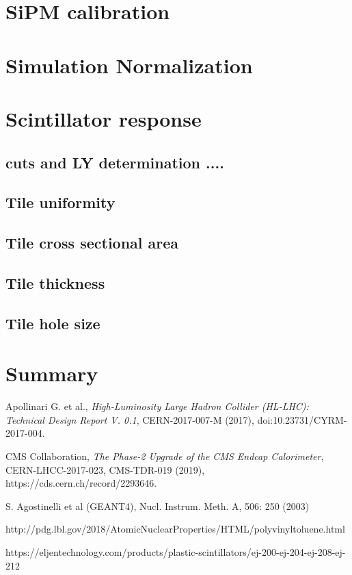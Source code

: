\documentclass[a4paper,11pt]{article}
\begin{document}
\section{SiPM calibration}
\label{sec:calibration}

\section{Simulation Normalization}

\section{Scintillator response}
\subsection{cuts and LY determination ....}
\subsection{Tile uniformity}
\subsection{Tile cross sectional area}

\subsection{Tile thickness}

\subsection{Tile hole size}

\section{Summary}


\begin{thebibliography}{99}

Apollinari G. et al., \emph{High-Luminosity Large Hadron Collider (HL-LHC): Technical Design Report V. 0.1}, CERN-2017-007-M (2017), doi:10.23731/CYRM-2017-004.

CMS Collaboration, \emph{The Phase-2 Upgrade of the CMS Endcap Calorimeter}, CERN-LHCC-2017-023, CMS-TDR-019 (2019), https://cds.cern.ch/record/2293646.

S. Agostinelli et al (GEANT4), Nucl. Instrum. Meth. A, 506: 250 (2003)

http://pdg.lbl.gov/2018/AtomicNuclearProperties/HTML/polyvinyltoluene.html

https://eljentechnology.com/products/plastic-scintillators/ej-200-ej-204-ej-208-ej-212

\end{thebibliography}
\end{document}
